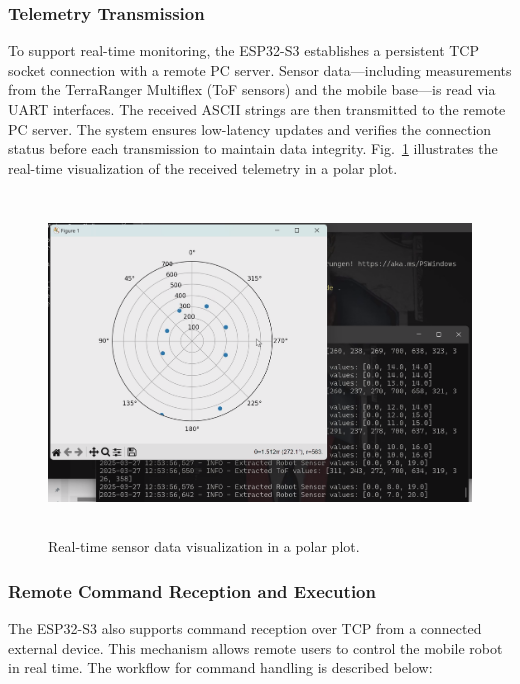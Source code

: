 \subsubsection{Telemetry Transmission}
To support real-time monitoring, the ESP32-S3 establishes a persistent TCP socket connection with a remote PC server. Sensor data—including measurements from the TerraRanger Multiflex (ToF sensors) and the mobile base—is read via UART interfaces. The received ASCII strings are then transmitted to the remote PC server. The system ensures low-latency updates and verifies the connection status before each transmission to maintain data integrity. Fig.~\ref{fig:live-data-streaming} illustrates the real-time visualization of the received telemetry in a polar plot.

\begin{figure}[H]
	\centering
	\includegraphics[height=9cm]{assets/LiveDataStreaming.png}
	\caption{Real-time sensor data visualization in a polar plot.}
	\label{fig:live-data-streaming}
\end{figure}

\subsubsection{Remote Command Reception and Execution}
The ESP32-S3 also supports command reception over TCP from a connected external device. This mechanism allows remote users to control the mobile robot in real time. The workflow for command handling is described below:

